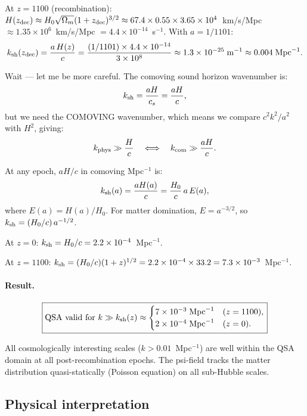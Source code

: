 \documentclass[aps,prd,twocolumn,nofootinbib]{revtex4-2}
\newcommand{\ee}[1]{\times 10^{#1}}
\newcommand{\ksh}{k_{\rm sh}}
\begin{document}
At $z = 1100$ (recombination): $H(z_{\rm dec}) \approx
H_0\sqrt{\Omega_m}(1+z_{\rm dec})^{3/2}
\approx 67.4 \times 0.55 \times 3.65\ee{4}$~km/s/Mpc
$\approx 1.35\ee{6}$~km/s/Mpc $= 4.4\ee{-14}$~s$^{-1}$.
With $a = 1/1101$:
\begin{equation}
\ksh(z_{\rm dec}) = \frac{a\,H(z)}{c}
= \frac{(1/1101)\times 4.4\ee{-14}}{3\ee{8}}
\approx 1.3\ee{-25}\;\text{m}^{-1}
\approx 0.004\;\text{Mpc}^{-1}.
\end{equation}

Wait --- let me be more careful. The comoving sound horizon wavenumber
is:
\begin{equation}
\ksh = \frac{aH}{c_s} = \frac{aH}{c},
\end{equation}
but we need the COMOVING wavenumber, which means we compare
$c^2 k^2/a^2$ with $H^2$, giving:
\begin{equation}
k_{\rm phys} \gg \frac{H}{c}
\quad\Longleftrightarrow\quad
k_{\rm com} \gg \frac{aH}{c}.
\end{equation}

At any epoch, $aH/c$ in comoving Mpc$^{-1}$ is:
\begin{equation}
\ksh(a) = \frac{aH(a)}{c}
= \frac{H_0}{c}\,a\,E(a),
\end{equation}
where $E(a) = H(a)/H_0$. For matter domination, $E = a^{-3/2}$,
so $\ksh = (H_0/c)\,a^{-1/2}$.

At $z = 0$: $\ksh = H_0/c = 2.2\ee{-4}$~Mpc$^{-1}$.

At $z = 1100$: $\ksh = (H_0/c)(1+z)^{1/2}
= 2.2\ee{-4} \times 33.2 = 7.3\ee{-3}$~Mpc$^{-1}$.

\paragraph{Result.}
\begin{equation}
\boxed{
\text{QSA valid for } k \gg \ksh(z) \approx
\begin{cases}
7\ee{-3}\;\text{Mpc}^{-1} & (z = 1100), \\
2\ee{-4}\;\text{Mpc}^{-1} & (z = 0).
\end{cases}
}
\label{eq:QSA-validity}
\end{equation}

All cosmologically interesting scales ($k > 0.01$~Mpc$^{-1}$) are
well within the QSA domain at all post-recombination epochs. The
psi-field tracks the matter distribution quasi-statically (Poisson
equation) on all sub-Hubble scales.

\subsection{Physical interpretation}
\end{document}

